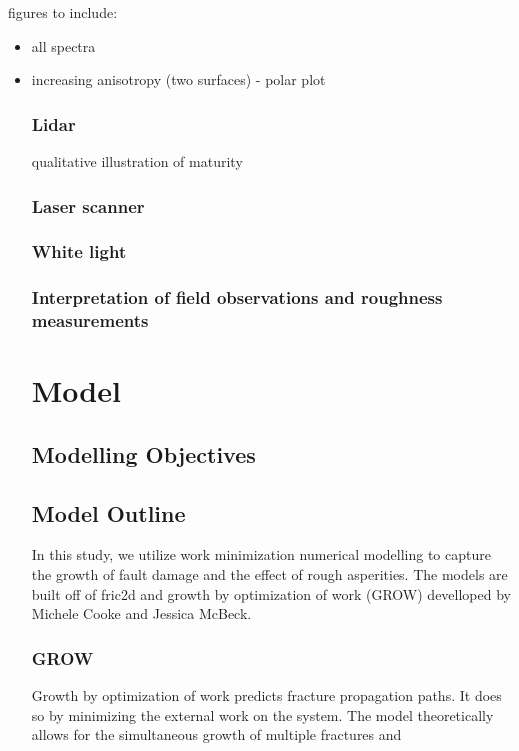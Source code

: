 \documentclass[12pt,a4paper]{article}
\begin{document}
figures to include:
\begin{itemize}
\item all spectra
\item increasing anisotropy (two surfaces) - polar plot

\subsubsection{Lidar}
qualitative illustration of maturity

\subsubsection{Laser scanner}

\subsubsection{White light}

\subsubsection{Interpretation of field observations and roughness measurements}

\section{Model}
	\subsection{Modelling Objectives}
	\subsection{Model Outline}
	
	In this study, we utilize work minimization numerical modelling to capture the growth of fault damage and the effect of rough asperities. The models are built off of fric2d and growth by optimization of work (GROW) develloped by Michele Cooke and Jessica McBeck.
	
		\subsubsection{GROW}
		Growth by optimization of work predicts fracture propagation paths. It does so by minimizing the external work on the system. The model theoretically allows for the simultaneous growth of multiple fractures and 
		

\end{itemize}
\end{document}
